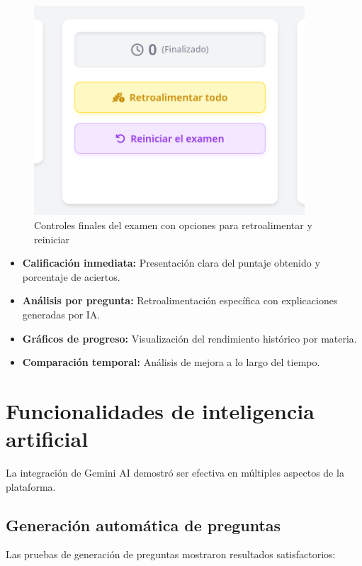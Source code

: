 \documentclass[12pt,a4paper]{report}
\begin{document}
\begin{figure}[h]
\centering
\includegraphics[width=0.9\textwidth]{assets/250617_06h49m37s_screenshot.png}
\caption{Controles finales del examen con opciones para retroalimentar y reiniciar}
\label{fig:controles-finales}
\end{figure}

\begin{itemize}
\item \textbf{Calificación inmediata:} Presentación clara del puntaje obtenido y porcentaje de aciertos.
\item \textbf{Análisis por pregunta:} Retroalimentación específica con explicaciones generadas por IA.
\item \textbf{Gráficos de progreso:} Visualización del rendimiento histórico por materia.
\item \textbf{Comparación temporal:} Análisis de mejora a lo largo del tiempo.
\end{itemize}

\section{Funcionalidades de inteligencia artificial}

La integración de Gemini AI demostró ser efectiva en múltiples aspectos de la plataforma.

\subsection{Generación automática de preguntas}

Las pruebas de generación de preguntas mostraron resultados satisfactorios:
\end{document}
